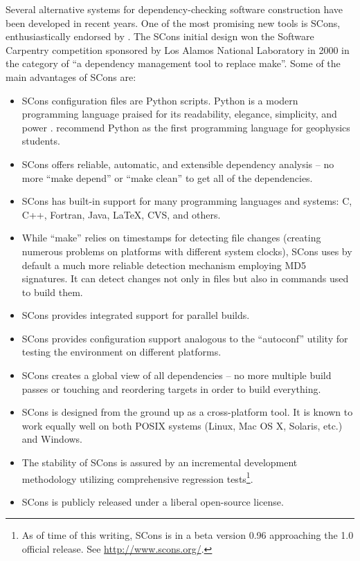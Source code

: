 Several alternative systems for dependency-checking software
construction have been developed in recent years. One of the most
promising new tools is SCons, enthusiastically endorsed by
\cite{dubois}. The SCons initial design won the Software Carpentry
competition sponsored by Los Alamos National Laboratory in 2000 in the
category of ``a dependency management tool to replace make''.  Some of
the main advantages of SCons are:
\begin{itemize}
\item SCons configuration files are Python scripts. Python is a modern
  programming language praised for its readability, elegance,
  simplicity, and power \cite[]{python1,python2}.
  \cite{TLE21-03-02600267} recommend Python as the first programming
  language for geophysics students.
\item SCons offers reliable, automatic, and extensible dependency
  analysis -- no more ``make depend'' or ``make clean'' to get all of
  the dependencies.
\item SCons has built-in support for many programming languages and
  systems: C, C++, Fortran, Java, LaTeX, CVS, and others.
\item While ``make'' relies on timestamps for detecting file changes
  (creating numerous problems on platforms with different system
  clocks), SCons uses by default a much more reliable detection
  mechanism employing MD5 signatures. It can detect changes not only
  in files but also in commands used to build them.
\item SCons provides integrated support for parallel builds.
\item SCons provides configuration support analogous to the ``autoconf''
  utility for testing the environment on different platforms.
\item SCons creates a global view of all dependencies -- no more
  multiple build passes or touching and reordering targets in order to
  build everything.
\item SCons is designed from the ground up as a cross-platform tool.
  It is known to work equally well on both POSIX systems (Linux, Mac
  OS X, Solaris, etc.) and Windows.
\item The stability of SCons is assured by an incremental development
  methodology utilizing comprehensive regression tests\footnote{As of
    time of this writing, SCons is in a beta version 0.96 approaching
    the 1.0 official release. See \url{http://www.scons.org/}.}.
\item SCons is publicly released under a liberal open-source license.
\end{itemize}


